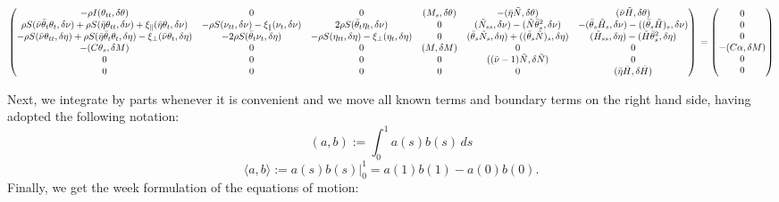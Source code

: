 \[\begin{pmatrix}
-\rho I (\theta_{tt},\delta\theta) & 0 & 0 & (M_s,\delta\theta) & -(\bar{\eta}\tilde{N},\delta\theta) & (\bar{\nu}\tilde{H},\delta\theta) 
\\
\rho S(\bar{\nu}\bar{\theta}_t\theta_t,\delta\nu) + \rho S (\bar{\eta}\theta_{tt},\delta\nu) + \xi_{\parallel}(\bar{\eta}\theta_t,\delta\nu) & -\rho S (\nu_{tt},\delta\nu) -\xi_{\parallel}(\nu_t,\delta\nu) & 2 \rho S(\bar{\theta}_t\eta_t,\delta\nu) & 0 & (\tilde{N}_{ss},\delta\nu) - (\tilde{N}\bar{\theta}_s^2,\delta\nu) & -(\bar{\theta}_s \tilde{H}_s,\delta\nu) - ((\bar{\theta}_s \tilde{H})_s,\delta\nu) 
\\
-\rho S (\bar{\nu}\theta_{tt},\delta\eta) + \rho S (\bar{\eta}\bar{\theta}_t\theta_t,\delta\eta) - \xi_{\perp}(\bar{\nu}\theta_t,\delta\eta) & - 2\rho S (\bar{\theta}_t \nu_t,\delta\eta) & -\rho S (\eta_{tt},\delta\eta) - \xi_{\perp}(\eta_t,\delta\eta) & 0 & (\bar{\theta}_s \tilde{N}_s, \delta\eta) + ((\bar{\theta}_s \tilde{N})_s,\delta\eta) & (\tilde{H}_{ss},\delta\eta) - (\tilde{H}\bar{\theta}_s^2,\delta\eta) 
\\
-(C\theta_s,\delta M) & 0 & 0 & (M, \delta M) & 0 & 0 
\\
0 & 0 & 0 & 0 & ((\bar{\nu}-1)\tilde{N}, \delta\tilde{N}) & 0 
\\
0 & 0 & 0 & 0 & 0 & (\bar{\eta}\tilde{H}, \delta \tilde{H}) 
\end{pmatrix}
\\ =
\begin{pmatrix}
0\\
0\\
0\\
-(C\alpha,\delta M) \\
0 \\
0
\end{pmatrix}\]

Next, we integrate by parts whenever it is convenient and we move all known terms and boundary terms on the right hand side, having adopted the following notation:
\[
(a,b) := \int_0^1 a(s) b(s) \, ds
\]
\[
\langle a,b \rangle := a(s) b(s) \big|^1_0 = a(1)b(1)-a(0)b(0).
\]
Finally, we get the week formulation of the equations of motion:

